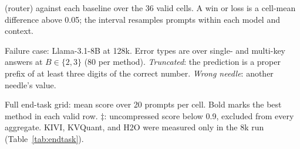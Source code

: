 \begin{table}[h]
\centering
\small
\caption{\sieve{} (router) against each baseline over the 36 valid cells.  A win or loss is a cell-mean difference above 0.05; the interval resamples prompts within each model and context.}
\label{tab:app-h2h}

\end{table}

\begin{table}[h]
\centering
\scriptsize
\setlength{\tabcolsep}{3pt}
\caption{Failure case: Llama-3.1-8B at 128k.  Error types are over single- and multi-key answers at $B\in\{2,3\}$ (80 per method).  \emph{Truncated}: the prediction is a proper prefix of at least three digits of the correct number.  \emph{Wrong needle}: another needle's value.}
\label{tab:app-fail}

\end{table}

\begin{table}[h]
\centering
\scriptsize
\setlength{\tabcolsep}{2.4pt}
\caption{Full end-task grid: mean score over 20 prompts per cell.  Bold marks the best method in each valid row.  $\ddagger$: uncompressed score below 0.9, excluded from every aggregate.  
KIVI, KVQuant, and H2O were measured only in the 8k run (Table~\ref{tab:endtask}).
}
\label{tab:app-grid}

\end{table}


